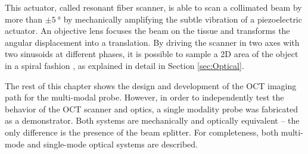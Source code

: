 This actuator, called resonant fiber scanner, is able to scan a collimated beam by more than $\pm \SI{5}{\degree}$ by mechanically amplifying the subtle vibration of a piezoelectric actuator.  An objective lens focuses the beam on the tissue and transforms the angular displacement into a translation. By driving the scanner in two axes with two sinusoids at different phases, it is possible to sample a 2D area of the object in a spiral fashion \cite{Seibel2006}, as explained in detail in Section \ref{sec:Optical}.

The rest of this chapter shows the design and development of the OCT imaging path for the multi-modal probe. However, in order to independently test the behavior of the OCT scanner and optics, a single modality probe was fabricated as a demonstrator. Both systems are mechanically and optically equivalent -- the only difference is the presence of the beam splitter. 
For completeness, both multi-mode and single-mode optical systems are described.